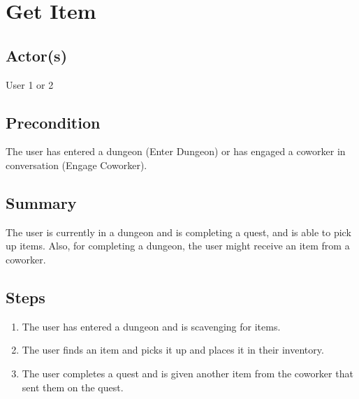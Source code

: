 \documentclass[12pt]{article}
\begin{document}
\section{Get Item}
	

		\subsection{Actor(s)}
			User 1 or 2
			

		\subsection{Precondition}
				The user has entered a dungeon (Enter Dungeon) or has engaged a coworker in conversation (Engage Coworker).
			
	
		\subsection{Summary}
				The user is currently in a dungeon and is completing a quest, and is able to pick up items. Also, for completing a dungeon, the user might receive an item from a coworker.
			\subsection{Steps}
			\begin{enumerate}
			\item The user has entered a dungeon and is scavenging for items.
			\item The user finds an item and picks it up and places it in their inventory.
			\item The user completes a quest and is given another item from the coworker that sent them on the quest.
			
			\end{enumerate}
\end{document}
